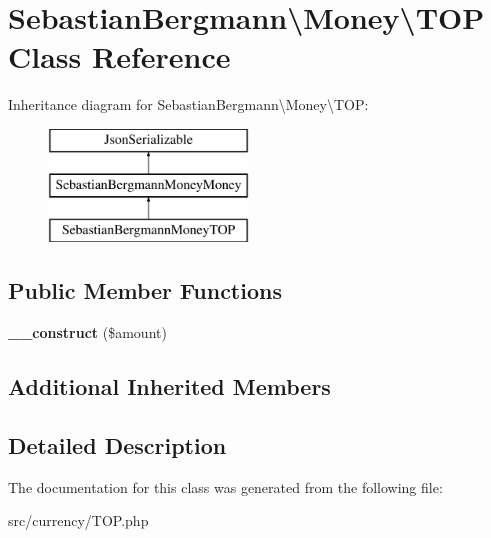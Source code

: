 \hypertarget{classSebastianBergmann_1_1Money_1_1TOP}{}\section{Sebastian\+Bergmann\textbackslash{}Money\textbackslash{}T\+O\+P Class Reference}
\label{classSebastianBergmann_1_1Money_1_1TOP}
Inheritance diagram for Sebastian\+Bergmann\textbackslash{}Money\textbackslash{}T\+O\+P\+:\begin{figure}[H]
\begin{center}
\leavevmode
\includegraphics[height=3.000000cm]{classSebastianBergmann_1_1Money_1_1TOP}
\end{center}
\end{figure}
\subsection*{Public Member Functions}
\begin{DoxyCompactItemize}
\item 
\hypertarget{classSebastianBergmann_1_1Money_1_1TOP_a40df4fde0f6f6473002feede725204ce}{}{\bfseries \+\_\+\+\_\+construct} (\$amount)\label{classSebastianBergmann_1_1Money_1_1TOP_a40df4fde0f6f6473002feede725204ce}

\end{DoxyCompactItemize}
\subsection*{Additional Inherited Members}


\subsection{Detailed Description}


The documentation for this class was generated from the following file\+:\begin{DoxyCompactItemize}
\item 
src/currency/T\+O\+P.\+php\end{DoxyCompactItemize}
